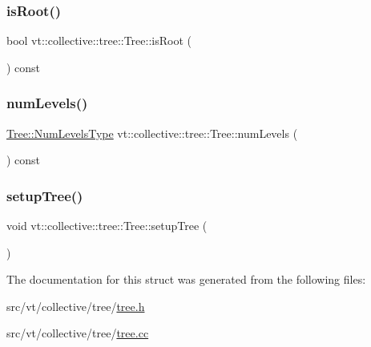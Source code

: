 \mbox{\label{structvt_1_1collective_1_1tree_1_1_tree_a88b2add909b0035f4844317481ed559b}} 
\subsubsection{\texorpdfstring{is\+Root()}{isRoot()}}
{\footnotesize\ttfamily bool vt\+::collective\+::tree\+::\+Tree\+::is\+Root (\begin{DoxyParamCaption}{ }\end{DoxyParamCaption}) const}

\mbox{\label{structvt_1_1collective_1_1tree_1_1_tree_a56532f6b47b9c71864980b73deee2d5a}} 
\subsubsection{\texorpdfstring{num\+Levels()}{numLevels()}}
{\footnotesize\ttfamily \hyperlink{structvt_1_1collective_1_1tree_1_1_tree_af64acc9543dc1bd1b56d6ed17b003425}{Tree\+::\+Num\+Levels\+Type} vt\+::collective\+::tree\+::\+Tree\+::num\+Levels (\begin{DoxyParamCaption}{ }\end{DoxyParamCaption}) const}

\mbox{\label{structvt_1_1collective_1_1tree_1_1_tree_aa3120d3bdbb2a308dd6831aa52d0ebb0}} 
\subsubsection{\texorpdfstring{setup\+Tree()}{setupTree()}}
{\footnotesize\ttfamily void vt\+::collective\+::tree\+::\+Tree\+::setup\+Tree (\begin{DoxyParamCaption}{ }\end{DoxyParamCaption})}



The documentation for this struct was generated from the following files\+:\begin{DoxyCompactItemize}
\item 
src/vt/collective/tree/\hyperlink{tree_8h}{tree.\+h}\item 
src/vt/collective/tree/\hyperlink{tree_8cc}{tree.\+cc}\end{DoxyCompactItemize}
